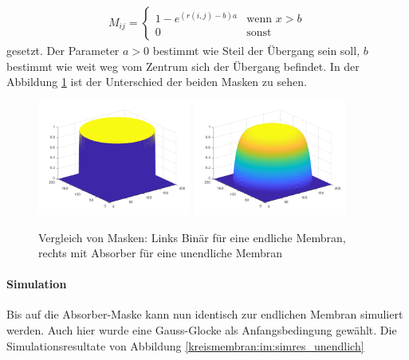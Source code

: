 \begin{align}
	M_{ij} = \begin{cases} 1-e^{(r(i,j)-b)a} & \text{wenn $x > b$} \\
		0 & \text{sonst} \end{cases}
\end{align}
gesetzt.
Der Parameter $a > 0$ bestimmt wie Steil der Übergang sein soll, $b$ bestimmt  wie weit weg vom Zentrum sich der Übergang befindet.
In der Abbildung \ref{kreismembran:im:masks} ist der Unterschied der beiden Masken zu sehen. 
\begin{figure}
	
	\begin{center}
		
		\includegraphics[width=0.45\textwidth]{papers/kreismembran/images/mask_disk.png}
		\includegraphics[width=0.45\textwidth]{papers/kreismembran/images/mask_absorber.png}
		\caption{Vergleich von Masken: Links Binär für eine endliche Membran, rechts mit Absorber für eine unendliche Membran}
		\label{kreismembran:im:masks}
	\end{center}	
\end{figure} 
\paragraph{Simulation}
Bis auf die Absorber-Maske kann nun identisch zur endlichen Membran simuliert werden.
Auch hier wurde eine Gauss-Glocke als Anfangsbedingung gewählt. 
Die Simulationsresultate von Abbildung \ref{kreismembran:im:simres_unendlich}

